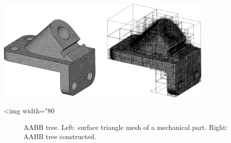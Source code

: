 \begin{center}
    \label{fig:AABB-tree-anchor}
    \begin{ccTexOnly}
      \includegraphics[width=0.8\textwidth]{AABB_tree/figs/anchor}
    \end{ccTexOnly}
    \begin{ccHtmlOnly}
        <img width="80%
    \end{ccHtmlOnly}
    \begin{figure}[h]
        \caption{AABB tree.
                 Left: surface triangle mesh of a mechanical part.
                 Right: AABB tree constructed.}
    \end{figure}
\end{center}

